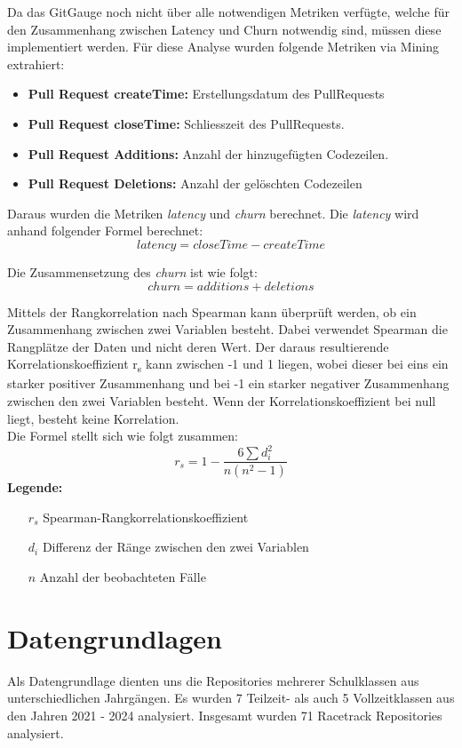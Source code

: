 Da das GitGauge noch nicht über alle notwendigen Metriken verfügte, welche für den Zusammenhang zwischen Latency und Churn notwendig sind, müssen diese implementiert werden. Für diese Analyse wurden folgende Metriken via Mining extrahiert:
\begin{itemize}
    \item \textbf{Pull Request createTime:} Erstellungsdatum des PullRequests
    \item \textbf{Pull Request closeTime:} Schliesszeit des PullRequests.
    \item \textbf{Pull Request Additions:} Anzahl der hinzugefügten Codezeilen.
    \item \textbf{Pull Request Deletions:} Anzahl der gelöschten Codezeilen
\end{itemize}

Daraus wurden die Metriken \textit{latency} und \textit{churn} berechnet. Die \textit{latency} wird anhand folgender Formel berechnet:
\begin{equation}
latency = closeTime - createTime
\end{equation}

Die Zusammensetzung des \textit{churn} ist wie folgt:
\begin{equation}
churn = additions + deletions
\end{equation}

Mittels der Rangkorrelation nach Spearman kann überprüft werden, ob ein Zusammenhang zwischen zwei Variablen besteht. Dabei verwendet Spearman die Rangplätze der Daten und nicht deren Wert. Der daraus resultierende Korrelationskoeffizient r\textsubscript{s} kann zwischen -1 und 1 liegen, wobei dieser bei eins ein starker positiver Zusammenhang und bei -1 ein starker negativer Zusammenhang zwischen den zwei Variablen besteht. Wenn der Korrelationskoeffizient bei null liegt, besteht keine Korrelation. \parencite{noauthor_t-test_nodate}  \\
Die Formel \parencite{noauthor_t-test_nodate} stellt sich wie folgt zusammen: 
\begin{equation}
r_s = 1 - \frac{6 \sum d_i^2}{n(n^2 - 1)}
\end{equation}
\label{eqn:spearman}
\noindent\textbf{Legende:}
\begin{itemize}
  \item [$r_s$] Spearman-Rangkorrelationskoeffizient
  \item[$d_i$] Differenz der Ränge zwischen den zwei Variablen 
  \item[$n$] Anzahl der beobachteten Fälle
\end{itemize}


\section{Datengrundlagen}
\label{sec:Datengrundlagen}
Als Datengrundlage dienten uns die Repositories mehrerer Schulklassen aus unterschiedlichen Jahrgängen. Es wurden 7 Teilzeit- als auch 5 Vollzeitklassen aus den Jahren 2021 - 2024 analysiert. Insgesamt wurden 71 Racetrack Repositories analysiert. 


